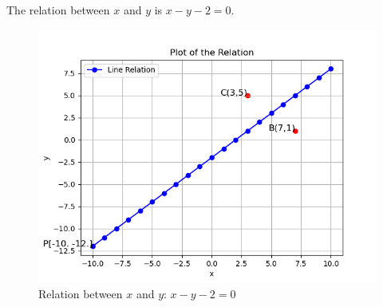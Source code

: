 \documentclass[journal]{IEEEtran}
\begin{document}
The relation between $x$ and $y$ is $x - y - 2 = 0.$
\begin{figure}[h!]
   \centering
   \includegraphics[width=0.7\linewidth]{figs/equi.png}
   \caption{Relation between $x$ and $y$: $x - y -2 = 0$}
   \end{figure}
   
\end{document}
